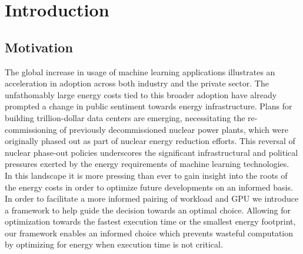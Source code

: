 \chapter{Introduction}\label{chap:introduction}

\section{Motivation}

The global increase in usage of machine learning applications
 illustrates an acceleration in adoption across
both industry and the private sector. The unfathomably
large energy costs tied to this broader adoption have
already prompted a change in public sentiment towards
energy infrastructure. Plans for building
trillion-dollar data centers are emerging, necessitating
the re-commissioning of previously decommissioned
nuclear power plants, which were originally phased
out as part of nuclear energy reduction efforts. This
reversal of nuclear phase-out policies underscores the
significant infrastructural and political pressures
exerted by the energy requirements of machine learning
technologies. \\
In this landscape it is more pressing than ever to gain
insight into the roots of the energy costs in order to
optimize future developments on an informed basis. \\
In order to facilitate a more informed pairing of workload 
and GPU we introduce a framework to help guide the decision 
towards an optimal choice. Allowing for optimization towards the fastest execution time or the smallest energy footprint, our framework enables an informed choice which prevents wasteful computation by optimizing for energy when execution time is not critical. 




